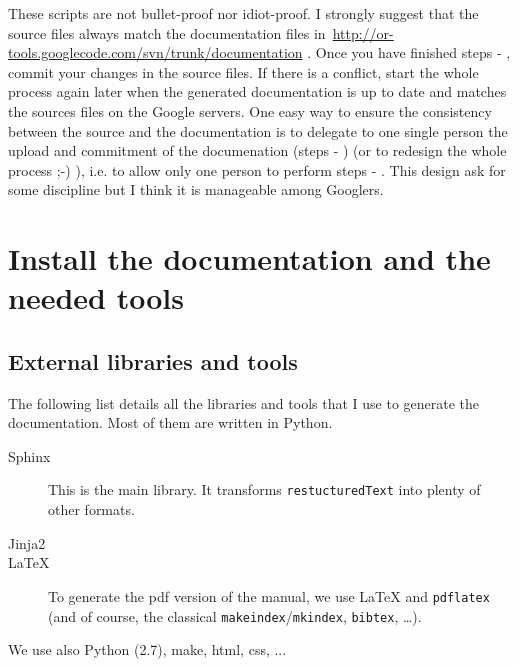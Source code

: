 \documentclass[a4paper,10pt]{article}
\begin{document}
These scripts are not bullet-proof nor idiot-proof. I strongly suggest that the source files always match the documentation files in~\href{http://or-tools.googlecode.com/svn/trunk/documentation}{http://or-tools.googlecode.com/svn/trunk/documentation} . Once you have finished steps  - , commit your changes in the source files. If there is a conflict, start the whole process again later when the generated documentation is up to date and matches the sources files on the Google servers. One easy way to ensure the consistency between the source and the documentation is to delegate to one single person the upload and commitment of the documenation (steps  - ) (or to redesign the whole process ;-) ), i.e. to allow only one person to perform steps  - . This design ask for some discipline but I think it is manageable among Googlers.



\section{Install the documentation and the needed tools}
\label{installation}

\subsection{External libraries and tools}

The following list details all the libraries and tools that I use to generate the documentation. Most of them are written in Python.

\begin{description}
 \item[Sphinx] This is the main library. It transforms \verb+restucturedText+ into plenty of other formats.
 \item[Jinja2] 
 \item[\LaTeX] To generate the pdf version of the manual, we use \LaTeX{} and \verb+pdflatex+ (and of course, the classical \verb+makeindex+/\verb+mkindex+, \verb+bibtex+, \ldots).
 \end{description}

We use also Python (2.7), make, html, css, ...
\end{document}
